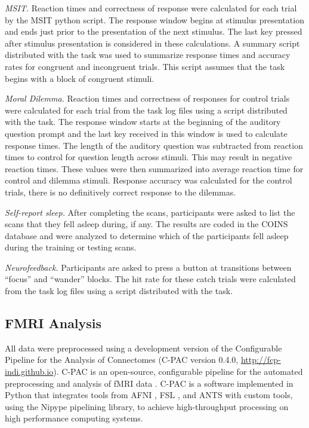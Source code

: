 \emph{MSIT.} Reaction times and correctness of response were calculated for each trial by the MSIT python script. The response window begins at stimulus presentation and ends just prior to the presentation of the next stimulus. The last key pressed after stimulus presentation is considered in these calculations. A summary script distributed with the task was used to summarize response times and accuracy rates for congruent and incongruent trials. This script assumes that the task begins with a block of congruent stimuli.

\emph{Moral Dilemma.} Reaction times and correctness of responses for control trials were calculated for each trial from the task log files using a script distributed with the task. The response window starts at the beginning of the auditory question prompt and the last key received in this window is used to calculate response times. The length of the auditory question was subtracted from reaction times to control for question length across stimuli. This may result in negative reaction times. These values were then summarized into average reaction time for control and dilemma stimuli. Response accuracy was calculated for the control trials, there is no definitively correct response to the dilemmas.

\emph{Self-report sleep.} After completing the scans, participants were asked to list the scans that they fell asleep during, if any. The results are coded in the COINS database and were analyzed to determine which of the participants fell asleep during the training or testing scans.

\emph{Neurofeedback.} Participants are asked to press a button at transitions between “focus” and “wander” blocks. The hit rate for these catch trials were calculated from the task log files using a script distributed with the task.

\subsection{FMRI Analysis}

All data were preprocessed using a development version of the Configurable Pipeline for the Analysis of Connectomes (C-PAC version 0.4.0, \url{http://fcp-indi.github.io}). C-PAC is an open-source, configurable pipeline for the automated preprocessing and analysis of fMRI data \cite{Craddock2013}. C-PAC is a software implemented in Python that integrates tools from AFNI \cite{Cox1996}, FSL \cite{Smith2004}, and ANTS \cite{Avants2008} with custom tools, using the Nipype \cite{Gorgolewski2011} pipelining library, to achieve high-throughput processing on high performance computing systems.

